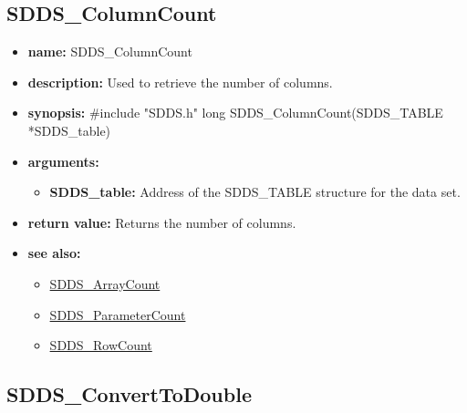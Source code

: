 \documentclass[11pt]{article}
\newcommand{\progref}[1]{\hyperref{SDDS_#1}{{\tt SDDS\_#1} (}{)}{SDDS_#1}}
\begin{document}
\subsection{SDDS\_ColumnCount}
\label{SDDS_ColumnCount}

\begin{itemize}
\item {\bf name:}\newline
SDDS\_ColumnCount
\item {\bf description:}\newline
Used to retrieve the number of columns.
\item {\bf synopsis:} \#include "SDDS.h"\newline
long SDDS\_ColumnCount(SDDS\_TABLE *SDDS\_table)
\item {\bf arguments:}
\begin{itemize}
\item {\bf SDDS\_table:} Address of the SDDS\_TABLE structure for the data set.
\end{itemize}
\item {\bf return value:}\newline
Returns the number of columns.
\item {\bf see also:}
\begin{itemize}
\item \progref{ArrayCount}
\item \progref{ParameterCount}
\item \progref{RowCount}
\end{itemize}
\end{itemize}

\subsection{SDDS\_ConvertToDouble}
\label{SDDS_ConvertToDouble}
\end{document}
